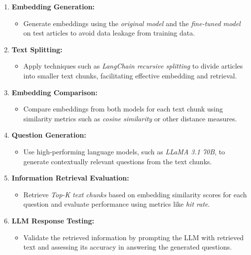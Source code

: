 \begin{enumerate}
    \item \textbf{Embedding Generation:}
    \begin{itemize}
        \item Generate embeddings using the \textit{original model} and the \textit{fine-tuned model} on test articles to avoid data leakage from training data.
    \end{itemize}

    \item \textbf{Text Splitting:}
    \begin{itemize}
        \item Apply techniques such as \textit{LangChain recursive splitting} to divide articles into smaller text chunks, facilitating effective embedding and retrieval.
    \end{itemize}

    \item \textbf{Embedding Comparison:}
    \begin{itemize}
        \item Compare embeddings from both models for each text chunk using similarity metrics such as \textit{cosine similarity} or other distance measures.
    \end{itemize}

    \item \textbf{Question Generation:}
    \begin{itemize}
        \item Use high-performing language models, such as \textit{LLaMA 3.1 70B}, to generate contextually relevant questions from the text chunks.
    \end{itemize}

    \item \textbf{Information Retrieval Evaluation:}
    \begin{itemize}
        \item Retrieve \textit{Top-K text chunks} based on embedding similarity scores for each question and evaluate performance using metrics like \textit{hit rate}.
    \end{itemize}

    \item \textbf{LLM Response Testing:}
    \begin{itemize}
        \item Validate the retrieved information by prompting the LLM with retrieved text and assessing its accuracy in answering the generated questions.
    \end{itemize}


\end{enumerate}
